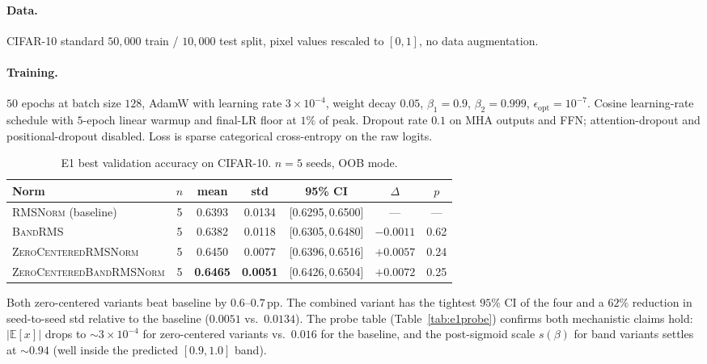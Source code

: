 \documentclass{article}
\newcommand{\E}{\mathbb{E}}
\newcommand{\rms}{\textsc{RMSNorm}}
\newcommand{\bandrms}{\textsc{BandRMS}}
\newcommand{\zcrms}{\textsc{ZeroCentered}\-\textsc{RMSNorm}}
\newcommand{\zcband}{\textsc{ZeroCentered}\-\textsc{BandRMSNorm}}
\begin{document}
\paragraph{Data.}
CIFAR-10 standard $50{,}000$ train / $10{,}000$ test split, pixel values rescaled to $[0, 1]$, no data augmentation.

\paragraph{Training.}
$50$ epochs at batch size $128$, AdamW with learning rate $3 \times 10^{-4}$, weight decay $0.05$, $\beta_1 = 0.9$, $\beta_2 = 0.999$, $\epsilon_{\text{opt}} = 10^{-7}$.
Cosine learning-rate schedule with $5$-epoch linear warmup and final-LR floor at $1\%$ of peak.
Dropout rate $0.1$ on MHA outputs and FFN; attention-dropout and positional-dropout disabled.
Loss is sparse categorical cross-entropy on the raw logits.

\begin{table}[H]
\centering
\caption{E1 best validation accuracy on CIFAR-10. $n{=}5$ seeds, OOB mode.}
\label{tab:e1}
\renewcommand{\arraystretch}{1.15}
\begin{tabular}{lcccccc}
\toprule
\textbf{Norm} & \textbf{$n$} & \textbf{mean} & \textbf{std} & \textbf{95\% CI} & \textbf{$\Delta$} & \textbf{$p$} \\
\midrule
\rms{} (baseline)                   & 5 & 0.6393 & 0.0134 & [0.6295,\,0.6500] & --- & --- \\
\bandrms{}                          & 5 & 0.6382 & 0.0118 & [0.6305,\,0.6480] & $-0.0011$ & 0.62 \\
\zcrms{}                            & 5 & 0.6450 & 0.0077 & [0.6396,\,0.6516] & $+0.0057$ & 0.24 \\
\zcband{}                           & 5 & \textbf{0.6465} & \textbf{0.0051} & [0.6426,\,0.6504] & $+0.0072$ & 0.25 \\
\bottomrule
\end{tabular}
\end{table}

Both zero-centered variants beat baseline by $0.6$--$0.7$\,pp.
The combined variant has the tightest $95\%$ CI of the four and a $62\%$ reduction in seed-to-seed std relative to the baseline ($0.0051$ vs.\ $0.0134$).
The probe table (Table~\ref{tab:e1probe}) confirms both mechanistic claims hold: $|\E[x]|$ drops to $\sim 3 \times 10^{-4}$ for zero-centered variants vs.\ $0.016$ for the baseline, and the post-sigmoid scale $s(\beta)$ for band variants settles at $\sim 0.94$ (well inside the predicted $[0.9, 1.0]$ band).
\end{document}
